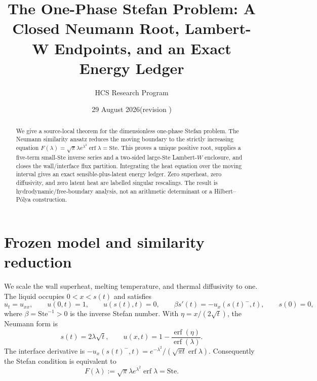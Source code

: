 \documentclass[10pt]{article}
\title{The One-Phase Stefan Problem: A Closed Neumann Root, Lambert-W Endpoints, and an Exact Energy Ledger}
\author{HCS Research Program}
\date{29 August 2026\quad (revision \CRevisionRound)}
\newcommand{\Ste}{\mathrm{Ste}}
\begin{document}
\maketitle
\begin{abstract}
We give a source-local theorem for the dimensionless one-phase Stefan problem.
The Neumann similarity ansatz reduces the moving boundary to the strictly
increasing equation $F(\lambda)=\sqrt\pi\lambda e^{\lambda^2}\operatorname{erf}\lambda=\Ste$.
This proves a unique positive root, supplies a five-term small-$\Ste$ inverse
series and a two-sided large-$\Ste$ Lambert-$W$ enclosure, and closes the
wall/interface flux partition. Integrating the heat equation over the moving
interval gives an exact sensible-plus-latent energy ledger. Zero superheat,
zero diffusivity, and zero latent heat are labelled singular rescalings. The
result is hydrodynamic/free-boundary analysis, not an arithmetic determinant or
a Hilbert--Pólya construction.
\end{abstract}

\section{Frozen model and similarity reduction}
We scale the wall superheat, melting temperature, and thermal diffusivity to
one. The liquid occupies $0<x<s(t)$ and satisfies
\begin{equation}
 u_t=u_{xx},\qquad u(0,t)=1,\qquad u(s(t),t)=0,
 \qquad \beta s'(t)=-u_x(s(t)^-,t),\qquad s(0)=0,
 \label{eq:model}
\end{equation}
where $\beta=\Ste^{-1}>0$ is the inverse Stefan number. With
$\eta=x/(2\sqrt t)$, the Neumann form is
\begin{equation}
 s(t)=2\lambda\sqrt t,\qquad
 u(x,t)=1-\frac{\operatorname{erf}(\eta)}{\operatorname{erf}(\lambda)}.
 \label{eq:profile}
\end{equation}
The interface derivative is
$-u_x(s(t)^-,t)=e^{-\lambda^2}/(\sqrt{\pi t}\operatorname{erf}\lambda)$.
Consequently the Stefan condition is equivalent to
\begin{equation}
 F(\lambda):=\sqrt\pi\lambda e^{\lambda^2}\operatorname{erf}\lambda=\Ste.
 \label{eq:root}
\end{equation}
\end{document}
